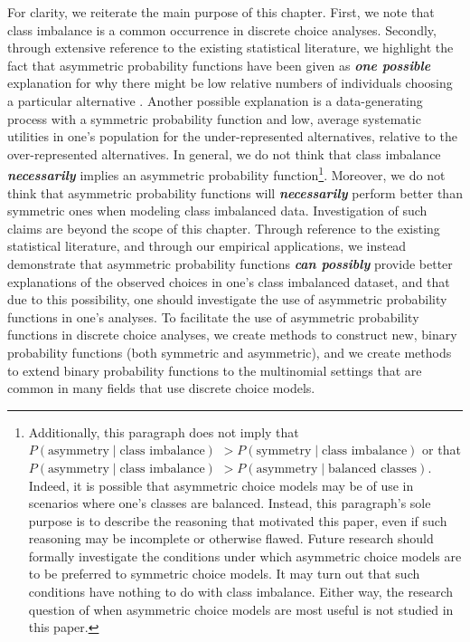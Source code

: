 For clarity, we reiterate the main purpose of this chapter. First, we note that class imbalance is a common occurrence in discrete choice analyses. Secondly, through extensive reference to the existing statistical literature, we highlight the fact that asymmetric probability functions have been given as \textit{\textbf{one possible}} explanation for why there might be low relative numbers of individuals choosing a particular alternative \citep[p. 1172]{chen_new_1999}. Another possible explanation is a data-generating process with a symmetric probability function and low, average systematic utilities in one's population for the under-represented alternatives, relative to the over-represented alternatives. In general, we do not think that class imbalance \textit{\textbf{necessarily}} implies an asymmetric probability function\footnote{Additionally, this paragraph does not imply that $P \left( \textrm{asymmetry} \mid \textrm{class imbalance} \right)$ $> P \left( \textrm{symmetry} \mid \textrm{class imbalance} \right)$ or that $P \left( \textrm{asymmetry} \mid \textrm{class imbalance} \right)$ $> P \left( \textrm{asymmetry} \mid \textrm{balanced classes} \right)$. Indeed, it is possible that asymmetric choice models may be of use in scenarios where one's classes are balanced. Instead, this paragraph's sole purpose is to describe the reasoning that motivated this paper, even if such reasoning may be incomplete or otherwise flawed. Future research should formally investigate the conditions under which asymmetric choice models are to be preferred to symmetric choice models. It may turn out that such conditions have nothing to do with class imbalance. Either way, the research question of when asymmetric choice models are most useful is not studied in this paper.}. Moreover, we do not think that asymmetric probability functions will \textit{\textbf{necessarily}} perform better than symmetric ones when modeling class imbalanced data. Investigation of such claims are beyond the scope of this chapter. Through reference to the existing statistical literature, and through our empirical applications, we instead demonstrate that asymmetric probability functions \textit{\textbf{can possibly}} provide better explanations of the observed choices in one's class imbalanced dataset, and that due to this possibility, one should investigate the use of asymmetric probability functions in one's analyses. To facilitate the use of asymmetric probability functions in discrete choice analyses, we create methods to construct new, binary probability functions (both symmetric and asymmetric), and we create methods to extend binary probability functions to the multinomial settings that are common in many fields that use discrete choice models.

